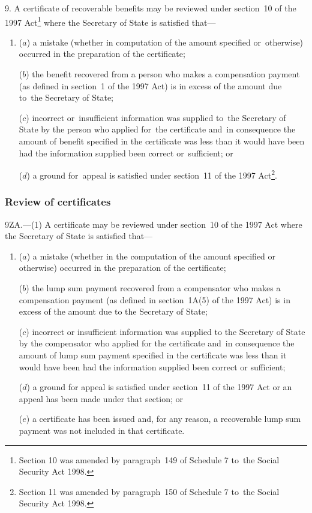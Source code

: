 \documentclass[12pt,a4paper]{article}
\begin{document}
\renewcommand\parthead{--- Part~II Chapter III}

9.  A certificate of recoverable benefits may be reviewed under section~10 of the 1997 Act\footnote{\frenchspacing Section 10 was amended by paragraph~149 of Schedule 7 to~the Social Security Act 1998.} where the Secretary of State is satisfied that—
\begin{enumerate}\item[]
($a$) a mistake (whether in computation of the amount specified or~otherwise) occurred in the preparation of the certificate;

($b$) the benefit recovered from a person who makes a compensation payment (as defined in section~1 of the 1997 Act) is in excess of the amount due to~the Secretary of State;

($c$) incorrect or~insufficient information was supplied to~the Secretary of State by the person who applied for~the certificate and~in consequence the amount of benefit specified in the certificate was less than it would have been had the information supplied been correct or~sufficient; or

($d$) a ground for~appeal is satisfied under section~11 of the 1997 Act\footnote{\frenchspacing Section 11 was amended by paragraph~150 of Schedule 7 to~the Social Security Act 1998.}.
\end{enumerate}

\subsubsection[9ZA. Review of certificates]{Review of certificates}

9ZA.---(1)  A certificate may be reviewed under section~10 of the 1997 Act where the Secretary of State is satisfied that—
\begin{enumerate}\item[]
($a$) a mistake (whether in the computation of the amount specified or otherwise) occurred in the preparation of the certificate;

($b$) the lump sum payment recovered from a compensator who makes a compensation payment (as defined in section~1A(5) of the 1997 Act) is in excess of the amount due to the Secretary of State;

($c$) incorrect or insufficient information was supplied to the Secretary of State by the compensator who applied for the certificate and~in consequence the amount of lump sum payment specified in the certificate was less than it would have been had the information supplied been correct or sufficient;

($d$) a ground for appeal is satisfied under section~11 of the 1997 Act or an appeal has been made under that section; or

($e$) a certificate has been issued and, for any reason, a recoverable lump sum payment was not included in that certificate.
\end{enumerate}
\end{document}
